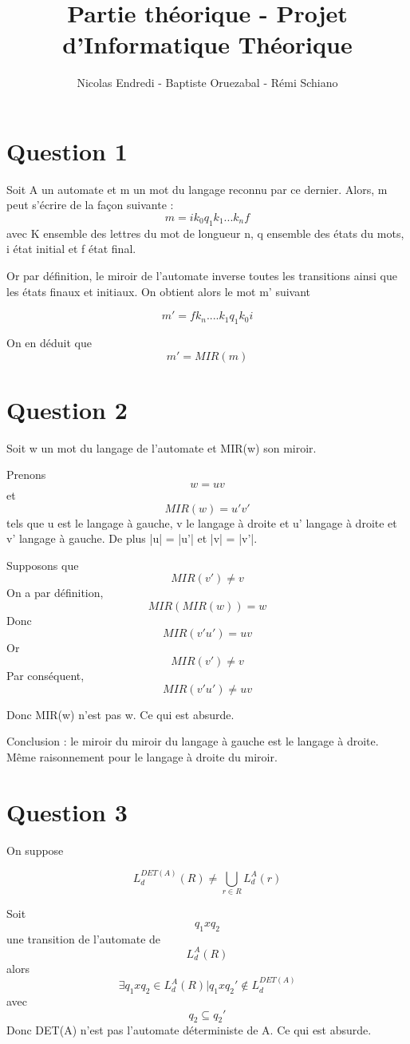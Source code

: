 \documentclass{article}
\title{Partie théorique - Projet d'Informatique Théorique}
\author{Nicolas Endredi - Baptiste Oruezabal - Rémi Schiano}
\begin{document}
\maketitle

\newpage

\section{Question 1}

Soit A un automate et m un mot du langage reconnu par ce dernier. Alors, m peut s'écrire de la façon suivante :
\[
m =  ik_{0}q_{1}k_{1}...k_{n}f
\]
avec K ensemble des lettres du mot de longueur n, q ensemble des états du mots, i état initial et f état final.

Or par définition, le miroir de l'automate inverse toutes les transitions ainsi que les états finaux et initiaux. On obtient alors le mot m' suivant

\[
m' = fk_{n}....k_{1}q_{1}k_{0}i
\]

On en déduit que 
\[
m' = MIR(m)
\]


\section{Question 2}

Soit w un mot du langage de l'automate et MIR(w) son miroir.

Prenons 
\[w = uv \] et  \[MIR(w) = u'v' \]
tels que u est le langage à gauche, v le langage à droite et u' langage à droite et v' langage à gauche. De plus |u| = |u'| et |v| = |v'|.

Supposons que \[ MIR(v') \neq v\] On a par définition, \[MIR(MIR(w)) = w \] Donc \[MIR(v'u') = uv \] Or \[MIR(v') \neq v \] Par conséquent, \[MIR(v'u') \neq uv\] 

Donc MIR(w) n'est pas w. Ce qui est absurde.

Conclusion : le miroir du miroir du langage à gauche est le langage à droite. Même raisonnement pour le langage à droite du miroir.

\section{Question 3}

On suppose

\[ L_d^{DET(A)}(R) \neq \bigcup_{r \in R} L _d^A(r)\]

Soit \[q_1xq_2\] une transition de l'automate de \[L_d^A(R)\] alors 
\[\exists q_1xq_2 \in L_d^A(R) | q_1xq_2' \notin L_d^{DET(A)}\]
avec \[ q_2 \subseteq q_2'\]
Donc DET(A) n'est pas l'automate déterministe de A. Ce qui est absurde.
\end{document}
